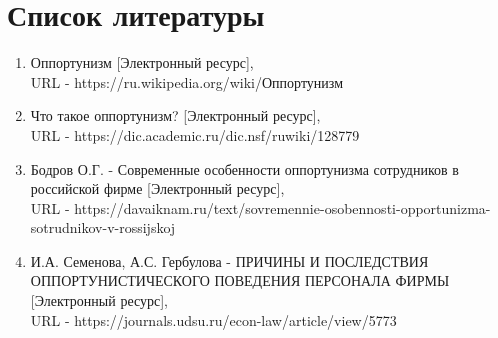 \documentclass[a4paper, 12pt]{article}
\begin{document}
\section{Список литературы}
\begin{enumerate}
	\item Оппортунизм [Электронный ресурс], \\URL - https://ru.wikipedia.org/wiki/Оппортунизм
	\item Что такое оппортунизм? [Электронный ресурс], \\URL - https://dic.academic.ru/dic.nsf/ruwiki/128779
	\item Бодров О.Г. - Современные особенности оппортунизма сотрудников в российской фирме [Электронный ресурс], \\URL - https://davaiknam.ru/text/sovremennie-osobennosti-opportunizma-sotrudnikov-v-rossijskoj
	\item И.А. Семенова, А.С. Гербулова - ПРИЧИНЫ И ПОСЛЕДСТВИЯ ОППОРТУНИСТИЧЕСКОГО ПОВЕДЕНИЯ ПЕРСОНАЛА ФИРМЫ  [Электронный ресурс], \\URL - https://journals.udsu.ru/econ-law/article/view/5773
\end{enumerate}
\end{document}
